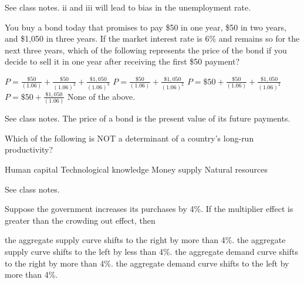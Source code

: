\documentclass[addpoints,11pt]{exam}
\theoremstyle{definition}
\begin{document}
\begin{questions}
\begin{choices}
\end{choices}

\begin{solution}
See class notes. ii and iii will lead to bias in the unemployment rate.
\end{solution}

\question You buy a bond today that promises to pay \$50 in one year, \$50 in two years, and \$1,050 in three years. If the market interest rate is 6\% and remains so for the next three years, which of the following represents the price of the bond if you decide to sell it in one year after receiving the first \$50 payment?

\begin{choices}
\choice $P = \frac{\$50}{(1.06)} + \frac{\$50}{(1.06)^2} + \frac{\$1,050}{(1.06)^3}$
\CorrectChoice $P = \frac{\$50}{(1.06)} + \frac{\$1,050}{(1.06)^2}$
\choice $P = \$50 + \frac{\$50}{(1.06)} + \frac{\$1,050}{(1.06)^2}$
\choice $P = \$50 + \frac{\$1,050}{(1.06)}$
\choice None of the above.
\end{choices}

\begin{solution}
See class notes. The price of a bond is the present value of its future payments.
\end{solution}

\question Which of the following is NOT a determinant of a country's long-run productivity?

\begin{choices} 
\choice Human capital
\choice Technological knowledge
\CorrectChoice Money supply
\choice Natural resources
\end{choices} 

\begin{solution}
See class notes.
\end{solution}

\question Suppose the government increases its purchases by 4\%. If the multiplier effect is greater than the crowding out effect, then

\begin{choices}
\choice the aggregate supply curve shifts to the right by more than 4\%.
\choice the aggregate supply curve shifts to the left by less than 4\%.
\CorrectChoice the aggregate demand curve shifts to the right by more than 4\%.
\choice the aggregate demand curve shifts to the left by more than 4\%. 
\end{choices}


\end{questions}
\end{document}
